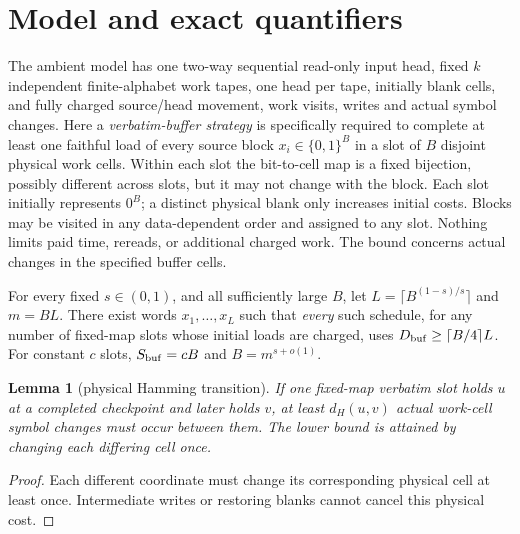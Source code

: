 \documentclass[11pt]{article}
\newtheorem{lemma}[theorem]{Lemma}
\begin{document}
\section{Model and exact quantifiers}
The ambient model has one two-way sequential read-only input head, fixed \(k\) independent finite-alphabet work tapes, one head per tape, initially blank cells, and fully charged source/head movement, work visits, writes and actual symbol changes. Here a \emph{verbatim-buffer strategy} is specifically required to complete at least one faithful load of every source block \(x_i\in\{0,1\}^B\) in a slot of \(B\) disjoint physical work cells. Within each slot the bit-to-cell map is a fixed bijection, possibly different across slots, but it may not change with the block. Each slot initially represents \(0^B\); a distinct physical blank only increases initial costs. Blocks may be visited in any data-dependent order and assigned to any slot. Nothing limits paid time, rereads, or additional charged work. The bound concerns actual changes in the specified buffer cells.

For every fixed \(s\in(0,1)\), and all sufficiently large \(B\), let \(L=\lceil B^{(1-s)/s}\rceil\) and \(m=BL\). There exist words \(x_1,\ldots,x_L\) such that \emph{every} such schedule, for any number of fixed-map slots whose initial loads are charged, uses \(D_{\rm buf}\ge \lceil B/4\rceil L\). For constant \(c\) slots, \(S_{\rm buf}=cB\) and \(B=m^{s+o(1)}\).

\begin{lemma}[physical Hamming transition]
If one fixed-map verbatim slot holds \(u\) at a completed checkpoint and later holds \(v\), at least \(d_H(u,v)\) actual work-cell symbol changes must occur between them. The lower bound is attained by changing each differing cell once.
\end{lemma}
\begin{proof}Each different coordinate must change its corresponding physical cell at least once. Intermediate writes or restoring blanks cannot cancel this physical cost.\end{proof}
\end{document}

